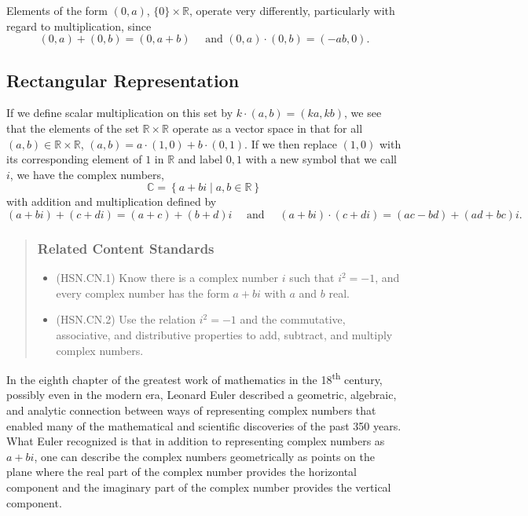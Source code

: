 \documentclass[
]{book}
\providecommand{\tightlist}{%
  \setlength{\itemsep}{0pt}\setlength{\parskip}{0pt}}
\theoremstyle{definition}
\theoremstyle{definition}
\theoremstyle{definition}
\theoremstyle{remark}
\begin{document}
Elements of the form \((0,a)\), \(\{0\}\times \mathbb{R}\), operate very differently, particularly with regard to multiplication, since
\[(0,a)+(0,b)=(0,a+b) \quad \mbox{ and }  (0,a) \cdot (0,b) = (-ab,0).\]

\hypertarget{rectangular-representation}{%
\subsection{Rectangular Representation}\label{rectangular-representation}}

If we define scalar multiplication on this set by \(k \cdot (a,b) = (ka,kb)\), we see that the elements of the set \(\mathbb{R} \times \mathbb{R}\) operate as a vector space in that for all \((a,b) \in \mathbb{R}\times \mathbb{R}\), \((a,b) = a \cdot (1,0) + b \cdot (0,1)\). If we then replace \((1,0)\) with its corresponding element of \(1\) in \(\mathbb{R}\) and label \(0,1\) with a new symbol that we call \(i\), we have the complex numbers, \[\mathbb{C} = \left\{ a+bi\middle \vert a, b\in \mathbb{R}\right\}\] with addition and multiplication defined by
\[(a+bi) + (c+di) = (a+c) + (b+d)i \quad \mbox{ and } \quad (a+bi) \cdot (c+di) = (ac-bd) + (ad+bc)i.\]

\begin{quote}
\hypertarget{related-content-standards-18}{%
\subsubsection*{Related Content Standards}\label{related-content-standards-18}}

\begin{itemize}
\tightlist
\item
  (HSN.CN.1) Know there is a complex number \(i\) such that \(i^2 = -1\), and every complex number has the form \(a + bi\) with \(a\) and \(b\) real.
\item
  (HSN.CN.2) Use the relation \(i^2 = -1\) and the commutative, associative, and distributive properties to add, subtract, and multiply complex numbers.
\end{itemize}
\end{quote}

In the eighth chapter of the greatest work of mathematics in the 18\textsuperscript{th} century, possibly even in the modern era, Leonard Euler \citeyearpar{Euler} described a geometric, algebraic, and analytic connection between ways of representing complex numbers that enabled many of the mathematical and scientific discoveries of the past 350 years. What Euler recognized is that in addition to representing complex numbers as \(a+bi\), one can describe the complex numbers geometrically as points on the plane where the real part of the complex number provides the horizontal component and the imaginary part of the complex number provides the vertical component.
\end{document}
